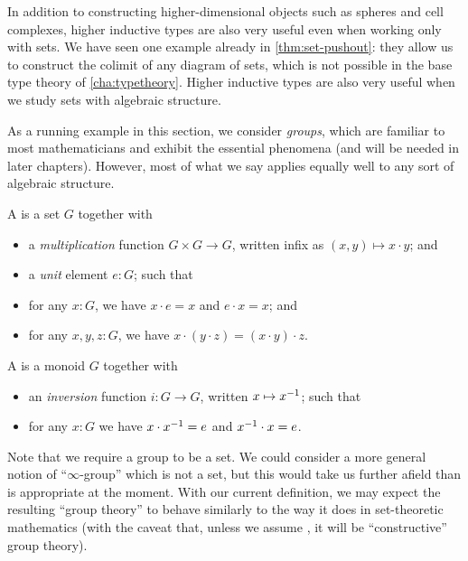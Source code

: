 In addition to constructing higher-dimensional objects such as spheres and cell complexes, higher inductive types are also very useful even when working only with sets.
We have seen one example already in \autoref{thm:set-pushout}: they allow us to construct the colimit of any diagram of sets, which is not possible in the base type theory of \autoref{cha:typetheory}.
Higher inductive types are also very useful when we study sets with algebraic structure.

As a running example in this section, we consider \emph{groups}, which are familiar to most mathematicians and exhibit the essential phenomena (and will be needed in later chapters).
However, most of what we say applies equally well to any sort of algebraic structure.

%

\begin{defn}
  A 
  is a set $G$ together with
  \begin{itemize}
  \item a \emph{multiplication}
    function $G\times G\to G$, written infix as $(x,y) \mapsto x\cdot y$; and
  \item a \emph{unit}
    element $e:G$; such that
  \item for any $x:G$, we have $x\cdot e = x$ and $e\cdot x = x$; and
  \item for any $x,y,z:G$, we have $x\cdot (y\cdot z) = (x\cdot y)\cdot z$.
  \end{itemize}
  A 
  is a monoid $G$ together with
  \begin{itemize}
  \item an \emph{inversion} function $i:G\to G$, written $x\mapsto \mathord{{x}^{-1}}$; such that
  \item for any $x:G$ we have $x\cdot \mathord{{x}^{-1}} = e$ and $\mathord{{x}^{-1}} \cdot x = e$.
  \end{itemize}
\end{defn}

\begin{rmk}\label{rmk:infty-group}
Note that we require a group to be a set.
We could consider a more general notion of ``$\infty$-group''%
which is not a set, but this would take us further afield than is appropriate at the moment.
With our current definition, we may expect the resulting ``group theory'' to behave similarly to the way it does in set-theoretic mathematics (with the caveat that, unless we assume \LEM{}, it will be ``constructive'' group theory).
\end{rmk}

